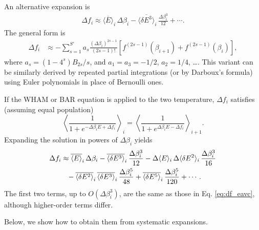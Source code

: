 \documentclass[aip,jcp,preprint,notitlepage, superscriptaddress]{revtex4-1}
\begin{document}
An alternative expansion is
%
\begin{align}
\Delta f_i
\approx
\overline{ \langle E \rangle }_i \, \Delta \beta_i
-
\overline{ \langle \delta E^3 \rangle }_i
\, \frac{ \Delta \beta_i^3 } { 12 }
+ \cdots.
\label{eq:df_eavc}
\end{align}
%
The general form is
\begin{align*}
\Delta f_i
&\approx
-\sum_{s = 1}^{S'}
  a_s
  \frac{ (\Delta \beta_i)^{2s - 1} } { (2 s - 1)! }
  \left[
    f^{(2s-1)}(\beta_{i+1})
    +
    f^{(2s-1)}(\beta_i)
  \right],
\end{align*}
where
$a_s = (1 - 4^s) B_{2s} /s$,
%
and
$a_1 = a_3 = -1/2$,
$a_2 = 1/4$,
\dots.
%
This variant can be similarly derived
by repeated partial integrations
(or by Darboux's formula\cite{
whittaker, wang_specfunc})
using Euler polynomials\cite{
wang_specfunc, abramowitz}
in place of Bernoulli ones.




If the WHAM or BAR equation
is applied to the two temperature,
$\Delta f_i$ satisfies
(assuming equal population)
%
\begin{equation*}
\left\langle
\frac{ 1 }
{ 1 + e^{-\Delta \beta_i E + \Delta f_i} }
\right\rangle_i
=
\left\langle
\frac{ 1 }
{ 1 + e^{\Delta \beta_i E - \Delta f_i} }
\right\rangle_{i+1}.
\end{equation*}
%
Expanding the solution
in powers of $\Delta \beta_i$
yields
\begin{align}
\Delta f_i
&
\approx
\overline{ \langle E \rangle }_i \, \Delta \beta_i
%
-\overline{ \langle \delta E^3 \rangle }_i
\, \frac{ \Delta \beta_i^3 } { 12 }
%
-\Delta \langle E \rangle_i
\, \Delta \langle \delta E^2 \rangle_i
\, \frac{ \Delta \beta_i^3 } { 16 }
\notag \\
&
\phantom{\approx}
%
-\overline{ \langle \delta E^2 \rangle }_i
\, \overline{ \langle \delta E^3 \rangle }_i
\, \frac{ \Delta \beta_i^5 } { 48 }
%
+\overline{ \langle \delta E^5 \rangle }_i
\, \frac{ \Delta \beta_i^5 } { 120 }
+ \cdots.
\notag
\end{align}
%
The first two terms, up to $O(\Delta \beta_i^3)$,
are the same as those in Eq. \eqref{eq:df_eavc},
although higher-order terms differ.
%





%
Below, we show how to obtain them from systematic expansions.
\end{document}
